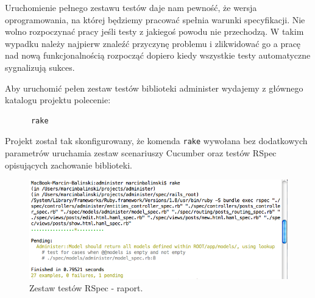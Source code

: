     Uruchomienie pełnego zestawu testów daje nam pewność, że wersja oprogramowania, na której będziemy pracować spełnia warunki specyfikacji. Nie wolno rozpoczynać pracy jeśli testy z jakiegoś powodu nie przechodzą. W takim wypadku należy najpierw znaleźć przyczynę problemu i zlikwidować go a pracę nad nową funkcjonalnością rozpocząć dopiero kiedy wszystkie testy automatyczne sygnalizują sukces.
    
    Aby uruchomić pełen zestaw testów biblioteki administer wydajemy z głównego katalogu projektu polecenie:
    
    \begin{lstlisting}
      rake
    \end{lstlisting}
    
    Projekt został tak skonfigurowany, że komenda \verb+rake+ wywołana bez dodatkowych parametrów uruchamia zestaw scenariuszy Cucumber oraz testów RSpec opisujących zachowanie biblioteki. 
    
    
    
    \begin{figure}[!h]
  		\begin{center}
  			\includegraphics[width=\linewidth]{images/spec_report.png}
  			\caption{Zestaw testów RSpec - raport.}
  			\label{spec_report}
  		\end{center}
  	\end{figure}
  	
  	\clearpage
  	
